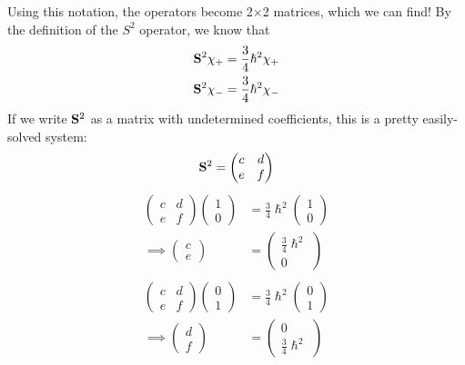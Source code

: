 \documentclass[a4paper]{article}
\begin{document}
Using this notation, the operators become 2$\times$2 matrices, which we can
find! By the definition of the $S^2$ operator, we know that
\begin{align*}
	\mathbf{S}^2\chi_+ &= \frac34\hslash^2\chi_+\\
	\mathbf{S}^2\chi_- &= \frac34\hslash^2\chi_-
\end{align*}
If we write $\mathbf{S}^2$ as a matrix with undetermined coefficients, this is
a pretty easily-solved system:
\[ \mathbf{S}^2 = \begin{pmatrix}c&d\\e&f\end{pmatrix} \]
\begin{align*}
	\begin{pmatrix}c&d\\e&f\end{pmatrix}
	\begin{pmatrix}1\\0\end{pmatrix}
	&=\frac34\hslash^2\begin{pmatrix}1\\0\end{pmatrix}\\
	\implies \begin{pmatrix}c\\e\end{pmatrix}&=
	\begin{pmatrix}\frac34\hslash^2\\0\end{pmatrix}\\~\\
	\begin{pmatrix}c&d\\e&f\end{pmatrix}
	\begin{pmatrix}0\\1\end{pmatrix}
	&=\frac34\hslash^2\begin{pmatrix}0\\1\end{pmatrix}\\
	\implies \begin{pmatrix}d\\f\end{pmatrix}&=
	\begin{pmatrix}0\\\frac34\hslash^2\end{pmatrix}\\
\end{align*}
\end{document}
